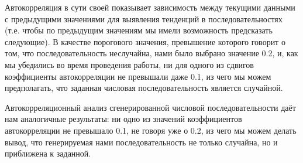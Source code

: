 \documentclass[a4paper]{article}
\begin{document}


Автокорреляция в сути своей показывает зависимость между текущими данными с предыдущими значениями для выявления
тенденций в последовательностях (т.е. чтобы по предыдущим значениям мы имели возможность предсказать
следующие).\newline
В качестве порогового значения, превышение которого говорит о том, что последовательность неслучайна, нами было выбрано
значение 0.2, и, как мы убедились во время проведения работы, ни для одного из сдвигов коэффициенты автокорреляции не
превышали даже 0.1, из чего мы можем предполагать, что заданная числовая последовательность является случайной.




Автокорреляционный анализ сгенерированной числовой последовательности даёт нам аналогичные результаты: ни одно из
значений коэффициентов автокорреляции не превышало 0.1, не говоря уже о 0.2, из чего мы можем делать вывод, что
генерируемая нами последовательность не только случайна, но и приближена к заданной.
\end{document}
